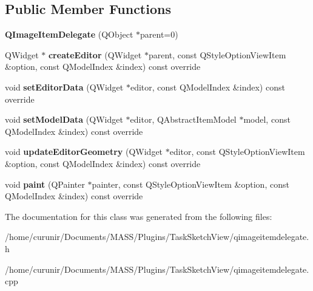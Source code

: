 \subsection*{Public Member Functions}
\begin{DoxyCompactItemize}
\item 
{\bfseries Q\+Image\+Item\+Delegate} (Q\+Object $\ast$parent=0)\hypertarget{class_q_image_item_delegate_a8c691fff46e302ec5b994268d38b8186}{}\label{class_q_image_item_delegate_a8c691fff46e302ec5b994268d38b8186}

\item 
Q\+Widget $\ast$ {\bfseries create\+Editor} (Q\+Widget $\ast$parent, const Q\+Style\+Option\+View\+Item \&option, const Q\+Model\+Index \&index) const override\hypertarget{class_q_image_item_delegate_aaf81d2e56521fc58dee01cd36cc5f305}{}\label{class_q_image_item_delegate_aaf81d2e56521fc58dee01cd36cc5f305}

\item 
void {\bfseries set\+Editor\+Data} (Q\+Widget $\ast$editor, const Q\+Model\+Index \&index) const override\hypertarget{class_q_image_item_delegate_a7bdd9939763a64ec4c8cee07ec978d31}{}\label{class_q_image_item_delegate_a7bdd9939763a64ec4c8cee07ec978d31}

\item 
void {\bfseries set\+Model\+Data} (Q\+Widget $\ast$editor, Q\+Abstract\+Item\+Model $\ast$model, const Q\+Model\+Index \&index) const override\hypertarget{class_q_image_item_delegate_ac3fa7afe57e2748b6c670d33fa784abf}{}\label{class_q_image_item_delegate_ac3fa7afe57e2748b6c670d33fa784abf}

\item 
void {\bfseries update\+Editor\+Geometry} (Q\+Widget $\ast$editor, const Q\+Style\+Option\+View\+Item \&option, const Q\+Model\+Index \&index) const override\hypertarget{class_q_image_item_delegate_ac2174be48aa2f16189dd8d5178547c79}{}\label{class_q_image_item_delegate_ac2174be48aa2f16189dd8d5178547c79}

\item 
void {\bfseries paint} (Q\+Painter $\ast$painter, const Q\+Style\+Option\+View\+Item \&option, const Q\+Model\+Index \&index) const override\hypertarget{class_q_image_item_delegate_a560c6de006eff503497a75834a2838f1}{}\label{class_q_image_item_delegate_a560c6de006eff503497a75834a2838f1}

\end{DoxyCompactItemize}


The documentation for this class was generated from the following files\+:\begin{DoxyCompactItemize}
\item 
/home/curunir/\+Documents/\+M\+A\+S\+S/\+Plugins/\+Task\+Sketch\+View/qimageitemdelegate.\+h\item 
/home/curunir/\+Documents/\+M\+A\+S\+S/\+Plugins/\+Task\+Sketch\+View/qimageitemdelegate.\+cpp\end{DoxyCompactItemize}
